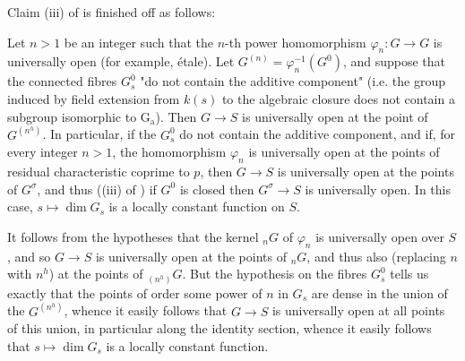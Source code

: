 Claim (iii) of  is finished off as follows:


\begin{corollary}\label{fga3.vi-1-corollary-1.5}
    Let $n>1$ be an integer such that the $n$-th power homomorphism $\varphi_n\colon G\to G$ is universally open (for example, étale).
    Let $G^{(n)}=\varphi_n^{-1}(G^0)$, and suppose that the connected fibres $G_s^0$ "do not contain the additive component" (i.e. the group induced by field extension from $k(s)$ to the algebraic closure does not contain a subgroup isomorphic to $\operatorname{G_a}$).
    Then $G\to S$ is universally open at the point of $G^{(n^h)}$.
    In particular, if the $G_s^0$ do not contain the additive component, and if, for every integer $n>1$, the homomorphism $\varphi_n$ is universally open at the points of residual characteristic coprime to $p$, then $G\to S$ is universally open at the points of $G^\sigma$, and thus ((iii) of ) if $G^0$ is closed then $G^\sigma\to S$ is universally open.
    In this case, $s\mapsto\dim G_s$ is a locally constant function on $S$.
\end{corollary}

\begin{cproof}
    It follows from the hypotheses that the kernel ${}_nG$ of $\varphi_n$ is universally open over $S$, and so $G\to S$ is universally open at the points of ${}_nG$, and thus also (replacing $n$ with $n^h$) at the points of ${}_{(n^h)}G$.
    But the hypothesis on the fibres $G_s^0$ tells us exactly that the points of order some power of $n$ in $G_s$ are dense in the union of the $G^{(n^h)}$, whence it easily follows that $G\to S$ is universally open at all points of this union, in particular along the identity section, whence it easily follows that $s\mapsto\dim G_s$ is a locally constant function.
\end{cproof}

